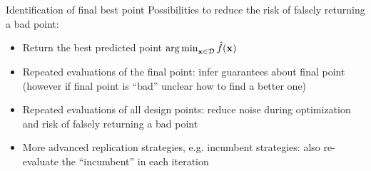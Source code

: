 \documentclass[11pt,compress,t,notes=noshow, xcolor=table]{beamer}
\begin{document}
\begin{vbframe}{Identification of final best point}
Possibilities to reduce the risk of falsely returning a bad point: 
\begin{itemize}
  \item Return the best predicted point $\operatorname{arg\,min}_{\mathbf{x} \in \mathcal{D}} \hat{f}(\mathbf{x})$
  \item Repeated evaluations of the final point: infer guarantees about final point (however if final point is \enquote{bad} unclear how to find a better one)
  \item Repeated evaluations of all design points: reduce noise during optimization and risk of falsely returning a bad point
  \item More advanced replication strategies, e.g. incumbent strategies: also re-evaluate the \enquote{incumbent} in each iteration
\end{itemize}

\end{vbframe}


\endlecture
\end{document}
